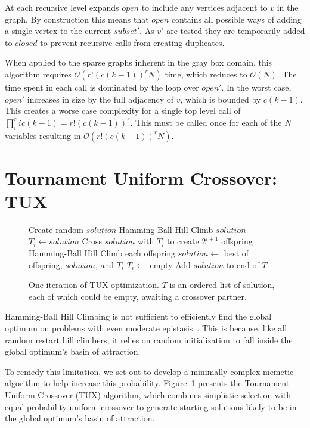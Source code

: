 \documentclass{sig-alternate}
\newcommand{\BigO}[1]{$\mathcal{O}{(#1)}$}
\begin{document}
At each recursive level  expands $open$ to include any vertices
adjacent to $v$ in the graph. By construction this means that $open$ contains
all possible ways of adding a single vertex to the current $subset'$. As $v'$
are tested they are temporarily added to $closed$ to prevent recursive calls
from creating duplicates.

When applied to the sparse graphs inherent in the gray box domain, this algorithm
requires \BigO{r!(c(k-1))^rN} time, which reduces to \BigO{N}. The time spent
in each call is dominated by the loop over $open'$. In the worst case, $open'$
increases in size by the full adjacency of $v$, which is bounded by $c(k-1)$.
This creates a worse case complexity for a single top level call of
$\prod_{i}^{r} ic(k-1) = r!(c(k-1))^r$. This must be called once for each
of the $N$ variables resulting in \BigO{r!(c(k-1))^rN}.

\section{Tournament Uniform Crossover: TUX}
\label{sec-tux}
\begin{figure}
  \begin{algorithmic}[1]
    \State Create random $solution$
    \State Hamming-Ball Hill Climb $solution$
        \State $T_i \leftarrow solution$
        \State \Return
      \EndIf
      \State Cross $solution$ with $T_i$ to create $2^{i+1}$ offspring
      \State Hamming-Ball Hill Climb each offspring
      \State $solution \leftarrow$ best of offspring, $solution$, and $T_i$
      \State $T_i \leftarrow$ empty
    \EndFor
    \State Add $solution$ to end of $T$
  \EndProcedure
\end{algorithmic}
  \caption{One iteration of TUX optimization. $T$ is an
           ordered list of solution, each of which could be empty,
           awaiting a crossover partner.}
  \label{fig-TUX}
\end{figure}

Hamming-Ball Hill Climbing is not sufficient to efficiently find the global optimum
on problems with even moderate epistasis~\cite{chicano:2014:ball}. This is because,
like all random restart hill climbers, it relies on random initialization to fall
inside the global optimum's basin of attraction.

To remedy this limitation, we set out to develop a minimally complex memetic
algorithm to help increase this probability. Figure~\ref{fig-TUX} presents
the Tournament Uniform Crossover (TUX) algorithm, which combines simplistic
selection with equal probability uniform crossover to generate starting
solutions likely to be in the global optimum's basin of attraction.
\end{document}
